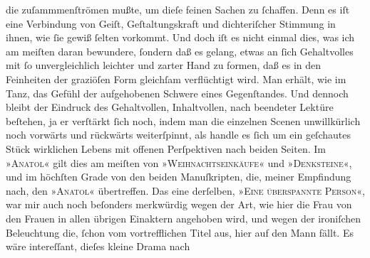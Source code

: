 \begin{ledgroupsized}[t]{13cm}
               die zuſammmenſtrömen mußte, um dieſe feinen Sachen zu ſchaffen. Denn es iſt eine
               Verbindung von Geiſt, Geſtaltungskraft und dichteriſcher Stimmung in ihnen, wie ſie
               gewiß ſelten vorkommt. Und doch iſt es nicht einmal dies, was ich am meiſten {\pb}daran bewundere, ſondern daß es gelang,
               etwas an ſich Gehaltvolles mit ſo unvergleichlich leichter und zarter Hand zu formen,
               daß es in den Feinheiten der graziöſen Form gleichſam verflüchtigt wird. Man erhält,
               wie im Tanz, das Gefühl der aufgehobenen Schwere eines Gegenſtandes. Und dennoch
               bleibt der Eindruck des Gehaltvollen, Inhaltvollen, nach beendeter Lektüre beſtehen,
               ja er verſtärkt ſich noch, indem man die einzelnen Scenen unwillkürlich noch vorwärts
               und rückwärts weiterſpinnt, als handle es ſich um ein geſchautes Stück wirklichen
               Lebens mit offenen Perſpektiven nach beiden Seiten. Im »\textsc{Anatol}« gilt dies am meiſten von »\textsc{Weihnachtseinkäufe}« und »\textsc{Denksteine}«, und im höchſten Grade von den beiden Manuſkripten, die, meiner Empfindung
               nach, den »\textsc{Anatol}« übertreffen. Das eine derſelben, »\textsc{Eine überspannte Person}«, war mir auch noch beſonders merkwürdig wegen der Art, wie hier die Frau von
               den Frauen {\pb}in allen übrigen Einaktern
               angehoben wird, und wegen der ironiſchen Beleuchtung die, ſchon vom vortrefflichen
               Titel aus, hier auf den Mann fällt. Es wäre intereſſant, dieſes kleine Drama nach

\end{ledgroupsized}
